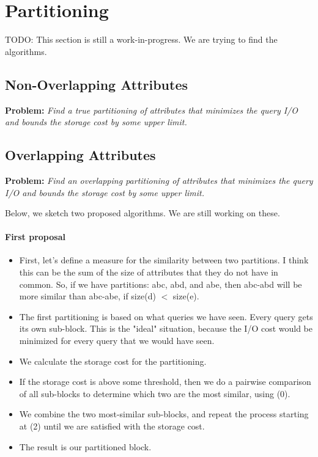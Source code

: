 \documentclass[twocolumn]{svjour3}          %
\begin{document}
\section{Partitioning}

TODO: This section is still a work-in-progress. We are trying to find the algorithms.


\subsection{Non-Overlapping Attributes}

\textbf{Problem:} \emph{Find a true partitioning of attributes that minimizes
  the query I/O and bounds the storage cost by some upper limit.}

\subsection{Overlapping Attributes}

\textbf{Problem:} \emph{Find an overlapping partitioning of attributes that minimizes
  the query I/O and bounds the storage cost by some upper limit.}

Below, we sketch two proposed algorithms. We are still working on these.

\paragraph{First proposal}

\begin{itemize}

\item First, let's define a measure for the similarity between two
partitions. I think this can be the sum of the size of attributes that
they do not have in common. So, if we have partitions: abc, abd, and
abe, then abc-abd will be more similar than abc-abe, if size(d) $<$
size(e).

\item The first partitioning is based on what queries we have seen.
Every query gets its own sub-block. This is the "ideal" situation,
because the I/O cost would be minimized for every query that we would
have seen.

\item We calculate the storage cost for the partitioning.

\item If the storage cost is above some threshold, then we do a pairwise
comparison of all sub-blocks to determine which two are the most
similar, using (0).

\item We combine the two most-similar sub-blocks, and repeat the process
starting at (2) until we are satisfied with the storage cost.

\item The result is our partitioned block.

\end{itemize}
\end{document}
